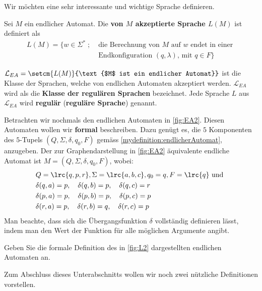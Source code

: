 Wir möchten eine sehr interessante und wichtige Sprache definieren.
\begin{mydefinition}\label{mydefinition:akzeptiereSpracheEA}
Sei $M$ ein endlicher Automat. Die \textbf{von $M$ akzeptierte Sprache $L(M)$} ist definiert als
\begin{equation*}
	\begin{split}
		L(M) =\{ w\in\Sigma^* \; ; \; & \text{die Berechnung von $M$ auf $w$ endet in einer }  \\
		                              & \text{Endkonfiguration $(q,\lambda)$, mit $q\in F$} \}
	\end{split}
\end{equation*}
\end{mydefinition}

\begin{mydefinition}\label{mydefinition:regulaereSprachen}
$\mathcal{L}_{EA} = \setcm{L(M)}{\text{$M$ ist ein endlicher Automat}}$ ist die Klasse der Sprachen, welche von endlichen Automaten akzeptiert werden. $\mathcal{L}_{EA}$ wird als die \textbf{Klasse der regulären Sprachen} bezeichnet. Jede Sprache $L$ aus $\mathcal{L}_{EA}$ wird \textbf{regulär} (\textbf{reguläre Sprache}) genannt.
\end{mydefinition}

Betrachten wir nochmals den endlichen Automaten in \cref{fig:EA2}. Diesen Automaten wollen wir \textbf{formal} beschreiben. Dazu genügt es, die $5$ Komponenten des $5$-Tupels $(Q,\Sigma, \delta, q_0, F)$ gemäss \cref{mydefinition:endlicherAutomat}, anzugeben. Der zur Graphendarstellung in \cref{fig:EA2} äquivalente endliche Automat  ist $M = (Q,\Sigma, \delta, q_0, F)$, wobei:
\begin{align*}
	 & Q = \lrc{q,p,r}, \Sigma = \lrc{a,b,c}, q_0 = q, F = \lrc{q}\text{ und } \\
	 & \delta(q,a) = p, \quad \delta(q,b) = p, \quad \delta(q,c) = r                       \\
	 & \delta(p,a) = p, \quad \delta(p,b) = p, \quad \delta(p,c) = p                       \\
	 & \delta(r,a) = p, \quad \delta(r,b) = q, \quad \delta(r,c) = p
\end{align*}
Man beachte, dass sich die Übergangsfunktion $\delta$ vollständig definieren lässt, indem man den Wert der Funktion für alle möglichen Argumente angibt.

\begin{myexercise}\label{myexercise:0404}
	Geben Sie die formale Definition des in \cref{fig:L2} dargestellten endlichen Automaten an.
\end{myexercise}
Zum Abschluss dieses Unterabschnitts wollen wir noch zwei nützliche Definitionen vorstellen.

